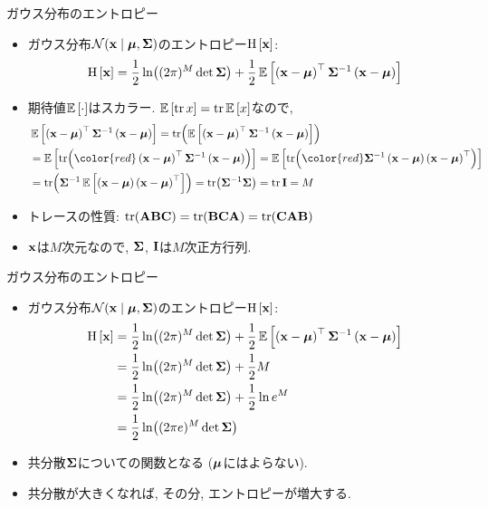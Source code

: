 \documentclass[dvipdfmx,notheorems,t]{beamer}
\begin{document}
\begin{frame}{ガウス分布のエントロピー}
\begin{itemize}
  \item ガウス分布$\mathcal{N}(\vb{x} \mid \vb*{\mu}, \vb{\Sigma})$のエントロピー$\operatorname{H} \left[ \vb{x} \right]$:
  \begin{align*}
    \operatorname{H} \left[ \vb{x} \right] = \frac{1}{2} \ln((2\pi)^M \det \vb{\Sigma})
      + \frac{1}{2} \operatorname{\mathbb{E}} \left[ \left( \vb{x} - \vb*{\mu} \right)^\top \vb{\Sigma}^{-1}
      \left( \vb{x} - \vb*{\mu} \right) \right]
  \end{align*}
  \item 期待値$\operatorname{\mathbb{E}} \left[ \cdot \right]$はスカラー. $\operatorname{\mathbb{E}} \left[ \tr x \right] = \tr \operatorname{\mathbb{E}} \left[ x \right]$なので,
  \begin{align*}
    & \E{\left( \vb{x} - \vb*{\mu} \right)^\top \vb{\Sigma}^{-1}
      \left( \vb{x} - \vb*{\mu} \right)}
      = \tr(\E{\left( \vb{x} - \vb*{\mu} \right)^\top \vb{\Sigma}^{-1}
        \left( \vb{x} - \vb*{\mu} \right)}) \\
      &= \E{\tr({\color{red} \left( \vb{x} - \vb*{\mu} \right)^\top \vb{\Sigma}^{-1}
        \left( \vb{x} - \vb*{\mu} \right)})}
      = \E{\tr({\color{red} \vb{\Sigma}^{-1} \left( \vb{x} - \vb*{\mu} \right)
        \left( \vb{x} - \vb*{\mu} \right)^\top})} \\
      &= \tr(\vb{\Sigma}^{-1} \E{\left( \vb{x} - \vb*{\mu} \right)
        \left( \vb{x} - \vb*{\mu} \right)^\top})
      = \tr(\vb{\Sigma}^{-1} \vb{\Sigma}) = \tr \vb{I} = M
  \end{align*}
  \item トレースの性質: $\tr(\vb{A} \vb{B} \vb{C}) = \tr(\vb{B} \vb{C} \vb{A}) = \tr(\vb{C} \vb{A} \vb{B})$
  \item $\vb{x}$は$M$次元なので, $\vb{\Sigma}$, $\vb{I}$は$M$次正方行列.
\end{itemize}
\end{frame}

\begin{frame}{ガウス分布のエントロピー}
\begin{itemize}
  \item ガウス分布$\mathcal{N}(\vb{x} \mid \vb*{\mu}, \vb{\Sigma})$のエントロピー$\operatorname{H} \left[ \vb{x} \right]$:
  \begin{align*}
    \operatorname{H} \left[ \vb{x} \right] &= \frac{1}{2} \ln((2\pi)^M \det \vb{\Sigma})
      + \frac{1}{2} \operatorname{\mathbb{E}} \left[ \left( \vb{x} - \vb*{\mu} \right)^\top \vb{\Sigma}^{-1}
      \left( \vb{x} - \vb*{\mu} \right) \right] \\
    &= \frac{1}{2} \ln((2\pi)^M \det \vb{\Sigma}) + \frac{1}{2} M \\
    &= \frac{1}{2} \ln((2\pi)^M \det \vb{\Sigma}) + \frac{1}{2} \ln e^M \\
    &= \frac{1}{2} \ln((2\pi e)^M \det \vb{\Sigma})
  \end{align*}
  \item 共分散$\vb{\Sigma}$についての関数となる ($\vb*{\mu}$にはよらない).
  \item 共分散が大きくなれば, その分, エントロピーが増大する.
\end{itemize}
\end{frame}
\end{document}

